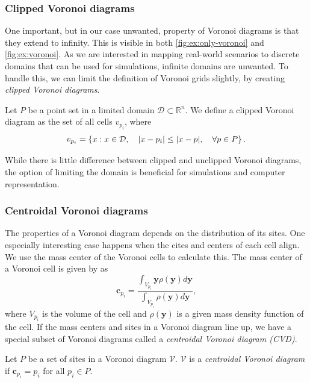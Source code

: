 \subsubsection{Clipped Voronoi diagrams}
One important, but in our case unwanted, property of Voronoi diagrams is that they extend to infinity. This is visible in both \autoref{fig:ex:only-voronoi} and \autoref{fig:ex:voronoi}. As we are interested in mapping real-world scenarios to discrete domains that can be used for simulations, infinite domains are unwanted. To handle this, we can limit the definition of Voronoi grids slightly, by creating \emph{clipped Voronoi diagrams}.

\begin{definition}
Let $P$ be a point set in a limited domain $\mathcal{D} \subset \mathbb{R}^n$. We define a clipped Voronoi diagram as the set of all cells $v_{p_i}$, where
\begin{equation}
\label{eq:clipped-voronoi}
    v_{p_i} = \left\{ x : x \in \mathcal{D},\quad \lvert x - p_i\rvert \leq \lvert x - p\rvert,\quad \forall p \in P \right\}.
\end{equation}
\end{definition}

While there is little difference between clipped and unclipped Voronoi diagrams, the option of limiting the domain is beneficial for simulations and computer representation.

\subsubsection{Centroidal Voronoi diagrams}
\label{sec:CVD}
The properties of a Voronoi diagram depends on the distribution of its sites. One especially interesting case happens when the cites and centers of each cell align. We use the mass center of the Voronoi cells to calculate this. The mass center of a Voronoi cell is given by \textcite{UPR_thesis} as
\begin{equation}
    \mathbf{c}_{p_i} = \frac
        {\int_{V_{p_i}} \mathbf{y} \rho(\mathbf{y}) d\mathbf{y}}
        {\int_{V_{p_i}} \rho(\mathbf{y}) d\mathbf{y}},
\end{equation}
where $V_{p_i}$ is the volume of the cell and $\rho(\mathbf{y})$ is a given mass density function of the cell. If the mass centers and sites in a Voronoi diagram line up, we have a special subset of Voronoi diagrams called a \emph{centroidal Voronoi diagram (CVD)}.

\begin{definition}
Let $P$ be a set of sites in a Voronoi diagram $\mathcal{V}$. $\mathcal{V}$ is a \emph{centroidal Voronoi diagram} if $\mathbf{c}_{p_i} = p_i$ for all $p_i \in P$.
\end{definition}

